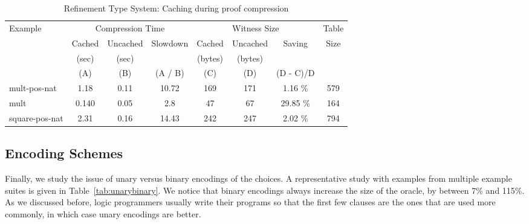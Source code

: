 \documentclass{llncs}
\begin{document}
\begin{table*}[htbp]
\begin{center}
\begin{small}
\begin{tabular}{|l|c|c|c|c|c|c|c|}
\hline
Example & \multicolumn{3}{c}{Compression Time} & 
\multicolumn{3}{c}{Witness Size} & Table\\
& Cached & Uncached & Slowdown & Cached & Uncached & Saving & Size\\
& (sec) & (sec) &  & (bytes) & (bytes) & & \\
& (A) & (B) & (A / B) & (C) & (D) & (D - C)/D &\\
\hline
mult-pos-nat & 1.18 & 0.11 & 10.72 & 169 & 171 & 1.16 \% & 579\\
mult & 0.140 & 0.05 & 2.8 & 47 & 67 & 29.85 \% & 164\\
square-pos-nat & 2.31 & 0.16 & 14.43 & 242 & 247 & 2.02 \% & 794\\
\hline
\end{tabular}
\end{small}
\end{center}
\caption{\label{tab:refcache} 
Refinement Type System: Caching during proof compression}
\end{table*}

\subsection{Encoding Schemes}
Finally, we study the issue of unary versus binary encodings of the choices.
A representative study with examples from multiple example suites is given
in Table~\ref{tab:unarybinary}. We notice that binary encodings always 
increase the size of the oracle, by between 7\% and 115\%. As we discussed
before, logic programmers usually write their programs so that the first
few clauses are the ones that are used more commonly, in which case unary 
encodings are better.
\end{document}
